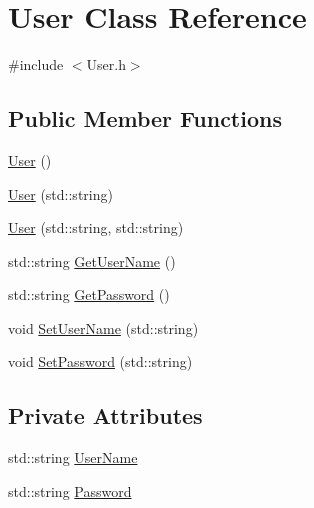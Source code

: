 \hypertarget{classUser}{\section{User Class Reference}
\label{classUser}
}


{\ttfamily \#include $<$User.\-h$>$}

\subsection*{Public Member Functions}
\begin{DoxyCompactItemize}
\item 
\hyperlink{classUser_a4a0137053e591fbb79d9057dd7d2283d}{User} ()
\item 
\hyperlink{classUser_a06d689355eff62c15130ffd2f06fdf28}{User} (std\-::string)
\item 
\hyperlink{classUser_a6c50170566109c0476cdceb4f5302c96}{User} (std\-::string, std\-::string)
\item 
std\-::string \hyperlink{classUser_a1bedb71c31d7af1e5a70819aa83e9de4}{Get\-User\-Name} ()
\item 
std\-::string \hyperlink{classUser_aa3447db463d01490433dba5e0af75b7a}{Get\-Password} ()
\item 
void \hyperlink{classUser_aac0cb11a0777bbc88de628ddb9ef8456}{Set\-User\-Name} (std\-::string)
\item 
void \hyperlink{classUser_a44a865bb873d57aab31c0e82150062e8}{Set\-Password} (std\-::string)
\end{DoxyCompactItemize}
\subsection*{Private Attributes}
\begin{DoxyCompactItemize}
\item 
std\-::string \hyperlink{classUser_a37c0392ff3d39a659a153830c97d9105}{User\-Name}
\item 
std\-::string \hyperlink{classUser_a2a7a82b1a850021c64eca35d33ef333e}{Password}
\end{DoxyCompactItemize}


